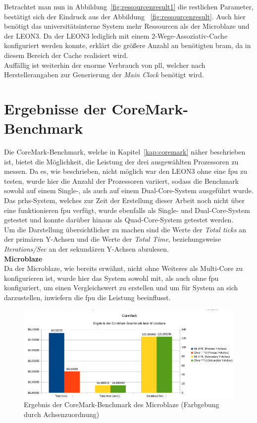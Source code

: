 Betrachtet man nun in Abbildung~\ref{fig:ressourcenresult1} die restlichen Parameter, bestätigt sich der Eindruck aus der Abbildung
~\ref{fig:ressourcenresult}. Auch hier benötigt das universitätsinterne System mehr Ressourcen als der Microblaze und der LEON3.
Da der LEON3 lediglich mit einem 2-Wege-Assoziativ-Cache konfiguriert werden konnte, erklärt die größere Anzahl an
benötigten \ac{bram}, da in diesem Bereich der Cache realisiert wird.\\
Auffällig ist weiterhin der enorme Verbrauch von \ac{pll}, welcher nach Herstellerangaben zur Generierung der \emph{Main Clock}
benötigt wird.\\

\newpage



\section{Ergebnisse der CoreMark-Benchmark}\label{kap:coremarktest}
Die CoreMark-Benchmark, welche in Kapitel~\ref{kap:coremark} näher beschrieben ist, bietet die Möglichkeit, die Leistung der drei ausgewählten Prozessoren zu messen. Da es, wie beschrieben,
nicht möglich war den LEON3 ohne eine \ac{fpu} zu testen, wurde hier die Anzahl der Prozessoren variiert, sodass die Benchmark sowohl auf einem Single-, als auch auf einem Dual-Core-System
ausgeführt wurde.\\
Das \ac{prhs}-System, welches zur Zeit der Erstellung dieser Arbeit noch nicht über eine funktionieren \ac{fpu} verfügt, wurde ebenfalls als Single- und Dual-Core-System getestet und konnte
darüber hinaus als Quad-Core-System getestet werden.\\
Um die Darstellung übersichtlicher zu machen sind die Werte der \emph{Total ticks} an der primären Y-Achsen und die Werte der \emph{Total Time}, beziehungsweise \emph{Iterations/Sec}
an der sekundären Y-Achsen abzulesen.\\

\textbf{Microblaze}\\
Da der Microblaze, wie bereits erwähnt, nicht ohne Weiteres als Multi-Core zu konfigurieren ist, wurde hier das System sowohl mit, als auch ohne \ac{fpu} konfiguriert, um einen
Vergleichswert zu erstellen und um für System an sich darzustellen, inwiefern die \ac{fpu} die Leistung beeinflusst.\\

\begin{figure}[H]
\centering
\includegraphics[width=1\textwidth]{Hauptteil/coremarkmb.png}
\caption{Ergebnis der CoreMark-Benchmark des Microblaze (Farbgebung durch Achsenzuordnung)}
\label{fig:coremarkmb}
\end{figure}


